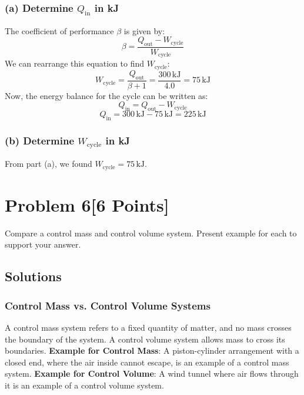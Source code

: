 \documentclass{article}
\begin{document}
\subsubsection*{(a) Determine \( Q_{\text{in}} \) in kJ}
The coefficient of performance \( \beta \) is given by:
\[
\beta = \frac{Q_{\text{out}}-W_{\text{cycle}}}{W_{\text{cycle}}}
\]
We can rearrange this equation to find \( W_{\text{cycle}} \):
\[
W_{\text{cycle}} = \frac{Q_{\text{out}}}{\beta + 1} = \frac{300 \, \text{kJ}}{4.0} = 75 \, \text{kJ}
\]
Now, the energy balance for the cycle can be written as:
\[
Q_{\text{in}} = Q_{\text{out}} - W_{\text{cycle}}
\]
\[
Q_{\text{in}} = 300 \, \text{kJ} - 75 \, \text{kJ} = 225 \, \text{kJ}
\]

\subsubsection*{(b) Determine \( W_{\text{cycle}} \) in kJ}
From part (a), we found \( W_{\text{cycle}} = 75 \, \text{kJ} \).

\newpage
\section*{Problem 6[6 Points]}
Compare a control mass and control volume system. Present example for each to support your answer.
\subsection*{Solutions}

\subsubsection*{Control Mass vs. Control Volume Systems}
A control mass system refers to a fixed quantity of matter, and no mass crosses the boundary of the system. A control volume system allows mass to cross its boundaries.
\newline \newline
\textbf{Example for Control Mass}: A piston-cylinder arrangement with a closed end, where the air inside cannot escape, is an example of a control mass system.
\newline \newline
\textbf{Example for Control Volume}: A wind tunnel where air flows through it is an example of a control volume system.
\end{document}

